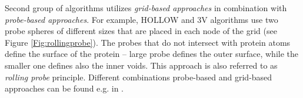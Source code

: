 
Second group of algorithms utilizes \textit{grid-based approaches} in combination with  \textit{probe-based approaches}. For example, HOLLOW \cite{Ho2008Hollow} and 3V \cite{voss20103v} algorithms use two probe spheres of different sizes that are placed in each node of the grid (see Figure \ref{Fig:rollingprobe}). The probes that do not intersect with protein atoms define the surface of the protein -- large probe defines the outer surface, while the smaller one defines also the inner voids. This approach is also referred to as \textit{rolling probe} principle. Different combinations probe-based and grid-based approaches can be found e.g. in \cite{kleywegt1994detection, czirjak2015princces, laskowski1995surfnet, yu2009roll}.

